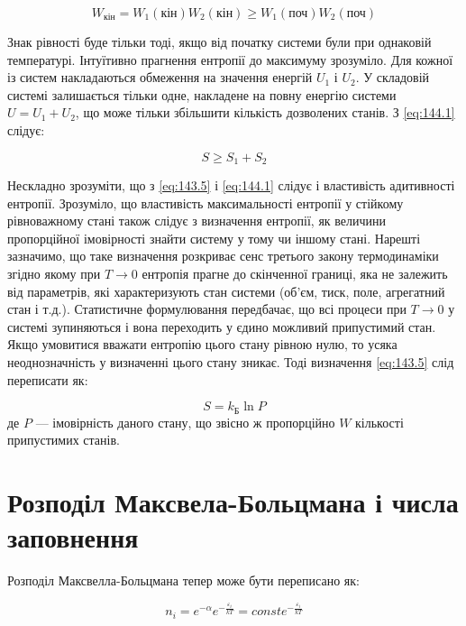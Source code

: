 \begin{equation}
	W_\text{кін} = W_1(\text{кін})W_2(\text{кін}) \geqslant W_1(\text{поч}) W_2(\text{поч})
	\label{eq:144.1}
\end{equation}

Знак рівності буде тільки тоді, якщо від початку системи були при однаковій температурі. Інтуїтивно прагнення ентропії до максимуму зрозуміло. Для кожної із систем накладаються обмеження на значення енергій $U_1$ і $U_2$. У складовій системі залишається тільки одне, накладене на повну енергію системи $U = U_1 + U_2$, що може тільки збільшити кількість дозволених станів. З \eqref{eq:144.1} слідує:

\begin{equation}
	S \geqslant S_1 + S_2
	\label{eq:144.2}
\end{equation}

Нескладно зрозуміти, що з \eqref{eq:143.5} і \eqref{eq:144.1} слідує і властивість адитивності ентропії. Зрозуміло, що властивість максимальності ентропії у стійкому рівноважному стані також слідує з визначення ентропії, як величини пропорційної імовірності знайти систему у тому чи іншому стані. Нарешті зазначимо, що таке визначення розкриває сенс третього закону термодинаміки згідно якому при $T \to 0$ ентропія прагне до скінченної границі, яка не залежить від параметрів, які характеризують стан системи (об’єм, тиск, поле, агрегатний стан і т.д.). Статистичне формулювання передбачає, що всі процеси при $T \to 0$ у системі зупиняються і вона переходить у єдино можливий припустимий стан. Якщо умовитися вважати ентропію цього стану рівною нулю, то усяка неоднозначність у визначенні цього стану зникає. Тоді визначення \eqref{eq:143.5} слід переписати як:

\begin{equation}
	S = k_\text{Б} \ln P
	\label{eq:144.3}
\end{equation}
%
де $P$ --- імовірність даного стану, що звісно ж пропорційно $W$ кількості припустимих станів.

\section{Розподіл Максвела-Больцмана і числа заповнення}

Розподіл Максвелла-Больцмана тепер може бути переписано як:

\begin{equation}
	n_i=e^{-\alpha}e^{-\frac{\varepsilon_i}{kT}}=const e^{-\frac{\varepsilon_i}{kT}}
	\label{eq:145.1}
\end{equation}

